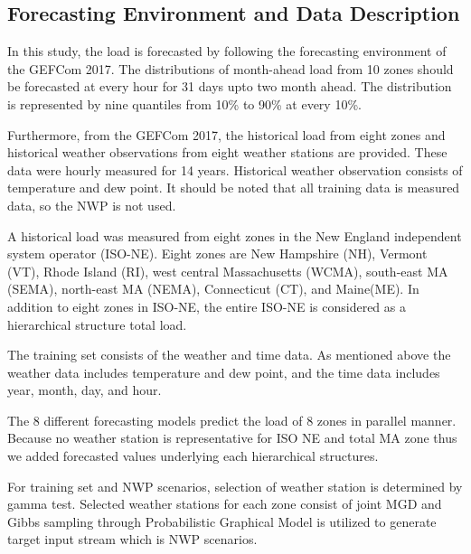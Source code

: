 \documentclass[journal]{IEEEtran} %
\begin{document}


\subsection{Forecasting Environment and Data Description}

In this study, the load is forecasted by following the forecasting environment of the GEFCom 2017. The distributions of month-ahead load from 10 zones should be forecasted at every hour for 31 days upto two month ahead. The distribution is represented by nine quantiles from 10\% to 90\% at every 10\%. 


Furthermore, from the GEFCom 2017, the historical load from eight zones and historical weather observations from eight weather stations are provided. These data were hourly measured for 14 years. Historical weather observation consists of temperature and dew point. It should be noted that all training data is measured data, so the NWP is not used. 

A historical load was measured from eight zones in the New England independent system operator (ISO-NE). Eight zones are New Hampshire (NH), Vermont (VT), Rhode Island (RI), west central Massachusetts (WCMA), south-east MA (SEMA), north-east MA (NEMA), Connecticut (CT), and Maine(ME). In addition to eight zones in ISO-NE, the entire ISO-NE is considered as a hierarchical structure total load.

The training set consists of the weather and time data. As mentioned above the weather data includes temperature and dew point, and the time data includes year, month, day, and hour. 

The 8 different forecasting models predict the load of 8 zones in parallel manner. Because no weather station is representative for ISO NE and total MA zone thus we added forecasted values underlying each hierarchical structures. 

For training set and NWP scenarios, selection of weather station is determined by gamma test. Selected weather stations for each zone consist of joint MGD and Gibbs sampling through Probabilistic Graphical Model is utilized to generate target input stream which is NWP scenarios.
\end{document}
